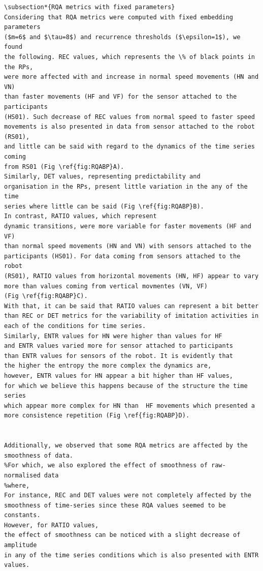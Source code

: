 \documentclass[10pt]{article}
\begin{document}
\begin{enumerate}
\begin{verbatim}
\subsection*{RQA metrics with fixed parameters}
Considering that RQA metrics were computed with fixed embedding parameters 
($m=6$ and $\tau=8$) and recurrence thresholds ($\epsilon=1$), we found 
the following. REC values, which represents the \% of black points in the RPs, 
were more affected with and increase in normal speed movements (HN and VN) 
than faster movements (HF and VF) for the sensor attached to the participants 
(HS01). Such decrease of REC values from normal speed to faster speed 
movements is also presented in data from sensor attached to the robot (RS01), 
and little can be said with regard to the dynamics of the time series coming 
from RS01 (Fig \ref{fig:RQABP}A).
Similarly, DET values, representing predictability and 
organisation in the RPs, present little variation in the any of the time 
series where little can be said (Fig \ref{fig:RQABP}B).
In contrast, RATIO values, which represent 
dynamic transitions, were more variable for faster movements (HF and VF) 
than normal speed movements (HN and VN) with sensors attached to the 
participants (HS01). For data coming from sensors attached to the robot 
(RS01), RATIO values from horizontal movements (HN, HF) appear to vary 
more than values coming from vertical movmentes (VN, VF) 
(Fig \ref{fig:RQABP}C).
With that, it can be said that RATIO values can represent a bit better
than REC or DET metrics for the variability of imitation activities in 
each of the conditions for time series.
Similarly, ENTR values for HN were higher than values for HF
and ENTR values varied more for sensor attached to participants 
than ENTR values for sensors of the robot. It is evidently that 
the higher the entropy the more complex the dynamics are, 
however, ENTR values for HN appear a bit higher than HF values, 
for which we believe this happens because of the structure the time series
which appear more complex for HN than  HF movements which presented a 
more consistence repetition (Fig \ref{fig:RQABP}D).


Additionally, we observed that some RQA metrics are affected by the 
smoothness of data. 
%For which, we also explored the effect of smoothness of raw-normalised data 
%where, 
For instance, REC and DET values were not completely affected by the 
smoothness of time-series since these RQA values seemed to be constants. 
However, for RATIO values, 
the effect of smoothness can be noticed with a slight decrease of amplitude 
in any of the time series conditions which is also presented with ENTR values.



\end{verbatim}
\end{enumerate}
\end{document}
